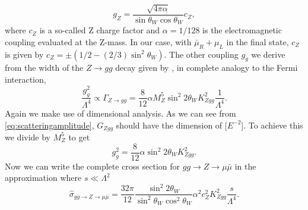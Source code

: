 \begin{equation}
	g_Z = \frac{\sqrt{4\pi\alpha}}{\sin{\theta_W}\cos{\theta_W}} c_Z,
\end{equation}
where $c_Z$ is a so-called Z charge factor and $\alpha = 1/128$ is the electromagnetic coupling evaluated at the Z-mass. In our case, with $\bar \mu_R + \mu_L$ in the final state, $c_Z$ is given by $c_Z = \pm (1/2 - (2/3)\sin^2{\theta_W})$. The other coupling $g_g$ we derive from the width of the $Z \rightarrow gg$ decay given by \cite{behr2003dnc}, in complete analogy to the Fermi interaction,
\begin{equation}
	\frac{g_g^2}{\Lambda^4} \propto \Gamma_{Z \rightarrow gg} = \frac{8}{12} \alpha M_Z^5 \sin^2{2\theta_W} K_{Zgg}^2 \frac{1}{\Lambda^4}.
\end{equation}
Again we make use of dimensional analysis. As we can see from \eqref{eq:scatteringamplitude}, $G_{Zgg}$ should have the dimension of [$E^{-2}$]. To achieve this we divide by $M_Z^5$ to get
\begin{equation}
	g_g^2 = \frac{8}{12} \alpha \sin^2{2\theta_W} K_{Zgg}^2.
\end{equation}
Now we can write the complete cross section for $gg \rightarrow Z \rightarrow \mu \bar \mu$ in the approximation where $s \ll \Lambda^2$
\begin{equation} \label{eq:sigmahatgg}
	\hat \sigma_{gg \rightarrow Z \rightarrow \mu \bar \mu} = \frac{32\pi}{12} \frac{\sin^2{2\theta_W}}{\sin^2{\theta_W}\cos^2{\theta_W}} \alpha^2 c_Z^2 K_{Zgg}^2 \frac{s}{\Lambda^4}.
\end{equation}

